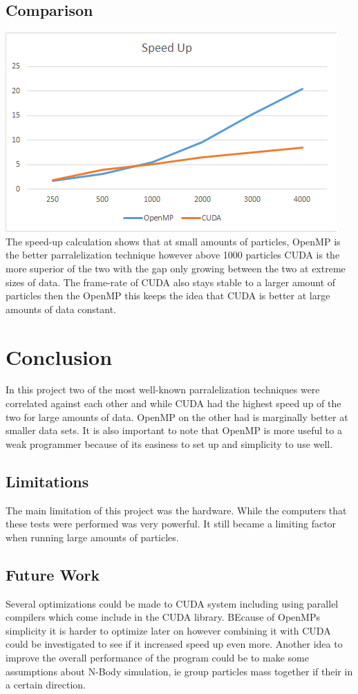 \documentclass[12pt]{article}
\begin{document}
\subsection{Comparison}
\includegraphics[scale=0.75]{pics/finalspeedup.png}
\newline
The speed-up calculation shows that at small amounts of particles, OpenMP is the better parralelization technique however above 1000 particles CUDA is the more superior of the two with the gap only growing between the two at extreme sizes of data.
\newline
The frame-rate of CUDA also stays stable to a larger amount of particles then the OpenMP this keeps the idea that CUDA is better at large amounts of data constant.
\newline

\section{Conclusion}
In this project two of the most well-known parralelization techniques were correlated
against each other and while CUDA had the highest speed up of the two for large amounts of data. OpenMP on the other had is marginally better at smaller data sets. It is also important to note that OpenMP is more useful to a weak programmer because of its  easiness to set up and simplicity to use well. 
\subsection{Limitations}
The main limitation of this project was the hardware. While the computers that these tests were performed was very powerful. It still became a limiting factor when running large amounts of particles.
\subsection{Future Work}
Several optimizations could be made to CUDA system including using parallel compilers which come include in the CUDA library. BEcause of OpenMPs simplicity it is harder to optimize later on however combining it with CUDA could be investigated to see if it increased speed up even more. Another idea to improve the overall performance of the program could be to make some assumptions about N-Body simulation, ie group particles mass together if their in a certain direction. 
\end{document}
